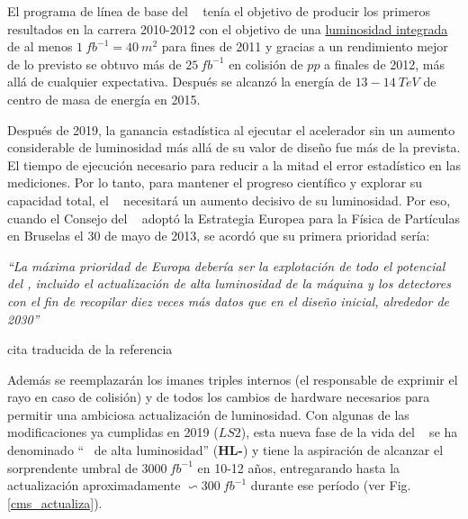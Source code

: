 El programa de línea de base del \LHC~ tenía el objetivo de producir los primeros resultados en la carrera 2010-2012 con el objetivo de una \href{https://es.wikipedia.org/wiki/Luminosidad}{luminosidad integrada} de al menos $1~fb^{-1} = 40~m^2$ para fines de 2011 y gracias a un rendimiento mejor de lo previsto se obtuvo más de $25~fb^{-1}$ en colisión de $pp$ a finales de 2012, más allá de cualquier expectativa. Después se alcanzó la energía de $13-14~TeV$ de centro de masa de energía en 2015.

Después de 2019, la ganancia estadística al ejecutar el acelerador sin un aumento considerable de luminosidad más allá de su valor de diseño fue más de la prevista. El tiempo de ejecución necesario para reducir a la mitad el error estadístico en las mediciones. Por lo tanto, para mantener el progreso científico y explorar su capacidad total, el \LHC ~ necesitará un aumento decisivo de su luminosidad. Por eso, cuando el Consejo del \CERN ~ adoptó la Estrategia Europea para la Física de Partículas en Bruselas el 30 de mayo de 2013, se acordó que su primera prioridad sería:

\begin{minipage}{0.9\linewidth}
\vspace{5pt}%
{\small }
\textit{``La máxima prioridad de Europa debería ser la explotación de todo el potencial del \LHC, incluido el actualización de alta luminosidad de la máquina y los detectores con el fin de recopilar diez veces más datos que en el diseño inicial, alrededor de 2030''}
\begin{flushright}
cita traducida de la referencia \cite{wells_upgraded_2015}
\end{flushright}
\vspace{5pt}%
\end{minipage}

Además se reemplazarán los imanes triples internos (el responsable de exprimir el rayo en caso de colisión) y de todos los cambios de hardware necesarios para permitir una ambiciosa actualización de luminosidad. Con algunas de las modificaciones ya cumplidas en 2019 ($LS2$), esta nueva fase de la vida del \LHC ~ se ha denominado ``\LHC ~ de alta luminosidad'' (\textbf{HL-}\LHC) y tiene la aspiración de alcanzar el sorprendente umbral de $3000~fb^{-1}$ en 10-12 años, entregarando hasta la actualización aproximadamente $\backsim 300~fb^{-1}$ durante ese período (ver Fig. \ref{cms_actualiza}).


